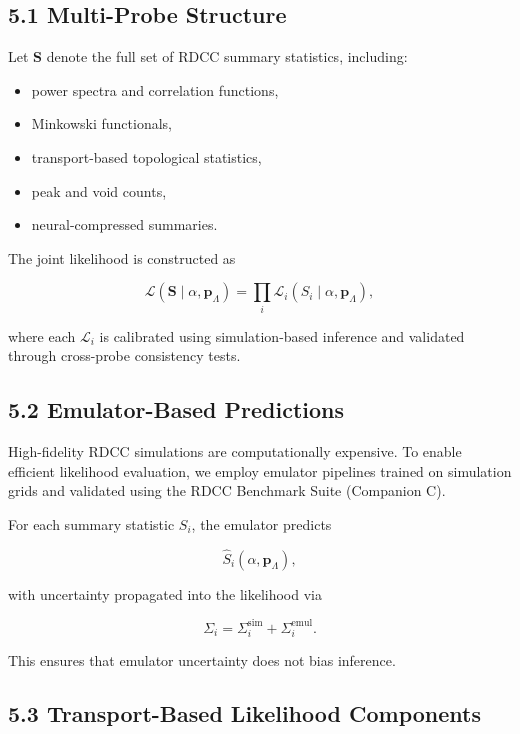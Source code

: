 \documentclass[11pt,a4paper]{article}
\begin{document}
\subsection*{5.1 Multi-Probe Structure}

Let $\mathbf{S}$ denote the full set of RDCC summary statistics, including:

\begin{itemize}
    \item power spectra and correlation functions,
    \item Minkowski functionals,
    \item transport-based topological statistics,
    \item peak and void counts,
    \item neural-compressed summaries.
\end{itemize}

The joint likelihood is constructed as


\[
    \mathcal{L}(\mathbf{S} \mid \alpha, \mathbf{p}_{\Lambda})
    =
    \prod_{i}
    \mathcal{L}_{i}
    \left(
        S_{i}
        \mid
        \alpha, \mathbf{p}_{\Lambda}
    \right),
\]


where each $\mathcal{L}_{i}$ is calibrated using simulation-based inference and 
validated through cross-probe consistency tests.

\subsection*{5.2 Emulator-Based Predictions}

High-fidelity RDCC simulations are computationally expensive. To enable 
efficient likelihood evaluation, we employ emulator pipelines trained on 
simulation grids and validated using the RDCC Benchmark Suite (Companion C).

For each summary statistic $S_{i}$, the emulator predicts


\[
    \widehat{S}_{i}(\alpha, \mathbf{p}_{\Lambda}),
\]


with uncertainty propagated into the likelihood via


\[
    \Sigma_{i}
    =
    \Sigma_{i}^{\mathrm{sim}}
    +
    \Sigma_{i}^{\mathrm{emul}}.
\]



This ensures that emulator uncertainty does not bias inference.

\subsection*{5.3 Transport-Based Likelihood Components}
\end{document}
